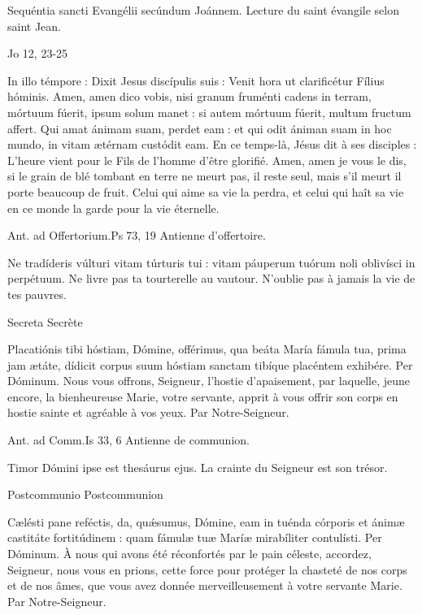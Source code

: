 \begin{paracol}{2}
Sequéntia sancti Evangélii secúndum Joánnem.
\switchcolumn
Lecture du saint évangile selon saint Jean.
\switchcolumn*

Jo 12, 23-25
\switchcolumn

\switchcolumn*

In illo témpore : Dixit Jesus discípulis  suis : Venit hora ut clarificétur Fílius hóminis. Amen, amen dico vobis, nisi granum fruménti cadens in terram, mórtuum fúerit, ipsum solum manet : si autem mórtuum fúerit, multum fructum affert. Qui amat ánimam suam, perdet eam : et qui odit ániman suam in hoc mundo, in vitam ætérnam custódit eam.
\switchcolumn
En ce temps-là, Jésus dit à ses disciples :  L’heure vient pour le Fils de l’homme d’être glorifié. Amen, amen je vous le dis, si le grain de blé tombant en terre ne meurt pas, il reste seul, mais s’il meurt il porte beaucoup de fruit. Celui qui aime  sa vie la perdra, et celui qui haît sa vie en ce monde la garde pour la vie éternelle.
\switchcolumn*

Ant. ad Offertorium.\hfill Ps 73, 19
\switchcolumn
Antienne d’offertoire.
\switchcolumn*

Ne tradíderis vúlturi vitam túrturis tui : vitam páuperum tuórum noli oblivísci in perpétuum.
\switchcolumn
Ne livre pas ta tourterelle au vautour. N’oublie pas à jamais la vie de tes pauvres.
\switchcolumn*

Secreta
\switchcolumn
Secrète
\switchcolumn*

Placatiónis tibi hóstiam, Dómine,  offérimus, qua beáta María fámula tua, prima jam ætáte, dídicit corpus suum hóstiam sanctam tibíque placéntem exhibére. Per Dóminum.
\switchcolumn
Nous vous offrons, Seigneur, l’hostie  d’apaisement, par laquelle, jeune encore, la bienheureuse Marie, votre servante, apprit à vous offrir son corps en hostie sainte et agréable à vos yeux. Par Notre-Seigneur.
\switchcolumn*

Ant. ad Comm.\hfill Is 33, 6
\switchcolumn
Antienne de communion.
\switchcolumn*

Timor Dómini ipse est thesáurus ejus.
\switchcolumn
La crainte du Seigneur est son trésor.
\switchcolumn*

Postcommunio
\switchcolumn
Postcommunion
\switchcolumn*

Cælésti pane reféctis, da, quǽsumus,  Dómine, eam in tuénda córporis et ánimæ castitáte fortitúdinem : quam fámulæ tuæ Maríæ mirabíliter contulísti. Per Dóminum.
\switchcolumn
À nous qui avons été réconfortés par le  pain céleste, accordez, Seigneur, nous vous en prions, cette force pour protéger la chasteté de nos corps et de nos âmes, que vous avez donnée merveilleusement à votre servante Marie. Par Notre-Seigneur.
\switchcolumn*


\end{paracol}
